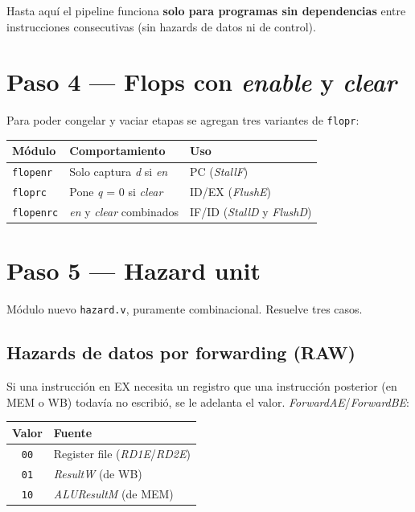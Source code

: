 \documentclass[11pt,a4paper]{article}
\newcommand{\sig}[1]{\textit{#1}}
\newcommand{\ins}[1]{\texttt{#1}}
\begin{document}
Hasta aquí el pipeline funciona \textbf{solo para programas sin dependencias} entre instrucciones consecutivas (sin hazards de datos ni de control).

\section{Paso 4 --- Flops con \sig{enable} y \sig{clear}}

Para poder congelar y vaciar etapas se agregan tres variantes de \ins{flopr}:

\begin{center}
\begin{tabular}{@{}lll@{}}
\toprule
Módulo & Comportamiento & Uso \\
\midrule
\ins{flopenr} & Solo captura \sig{d} si \sig{en} & PC (\sig{StallF}) \\
\ins{floprc} & Pone \sig{q} = 0 si \sig{clear} & ID/EX (\sig{FlushE}) \\
\ins{flopenrc} & \sig{en} y \sig{clear} combinados & IF/ID (\sig{StallD} y \sig{FlushD}) \\
\bottomrule
\end{tabular}
\end{center}

\section{Paso 5 --- Hazard unit}

Módulo nuevo \ins{hazard.v}, puramente combinacional. Resuelve tres casos.

\subsection{Hazards de datos por forwarding (RAW)}

Si una instrucción en EX necesita un registro que una instrucción posterior (en MEM o WB) todavía no escribió, se le adelanta el valor. \sig{ForwardAE}/\sig{ForwardBE}:

\begin{center}
\begin{tabular}{@{}cl@{}}
\toprule
Valor & Fuente \\
\midrule
\ins{00} & Register file (\sig{RD1E}/\sig{RD2E}) \\
\ins{01} & \sig{ResultW} (de WB) \\
\ins{10} & \sig{ALUResultM} (de MEM) \\
\bottomrule
\end{tabular}
\end{center}
\end{document}

